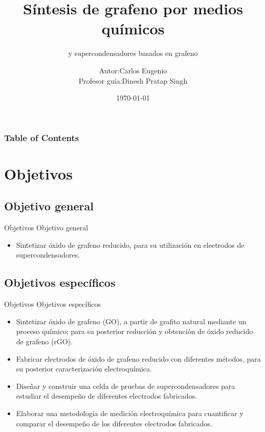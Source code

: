 \documentclass{beamer}
\title{Síntesis de grafeno por medios químicos}
\subtitle{y supercondensadores basados en grafeno}
\date{\today}
\institute{Universidad de Santiago de Chile\\ Laboratorio de Nanosíntesis}
\begin{document}
	\author[Carlos Eugenio]{\begin{tabular}{r@{ }l} 
			Autor:      & Carlos Eugenio \\[1ex] 
			Profesor guía: & Dinesh Pratap Singh
	\end{tabular}}
	\maketitle
	\begin{frame}
		\frametitle{Table of Contents}
		\tableofcontents[currentsection]
	\end{frame}

	\section{Objetivos}
	\subsection{Objetivo general}
	\begin{frame}{Objetivos}
	Objetivo general
		\begin{itemize}
			\item Sintetizar óxido de grafeno reducido, para su utilización en electrodos de supercondensadores.
		\end{itemize}
	
	\end{frame}

	\subsection{Objetivos específicos}
	\begin{frame}{Objetivos}
	Objetivos específicos
		\begin{itemize}[<+>]
			\item Sintetizar óxido de grafeno (GO), a partir de grafito natural mediante un proceso químico; para su posterior reducción y obtención de óxido reducido de grafeno (rGO).
			\item Fabricar electrodos de óxido de grafeno reducido con diferentes métodos, para su posterior caracterización electroquímica.
			\item Diseñar y construir una celda de pruebas de supercondensadores para estudiar el desempeño de diferentes electrodos fabricados.
			\item Elaborar una metodología de medición electroquímica para cuantificar y comparar el desempeño de los diferentes electrodos fabricados. 
		\end{itemize}
	\end{frame}
\end{document}
